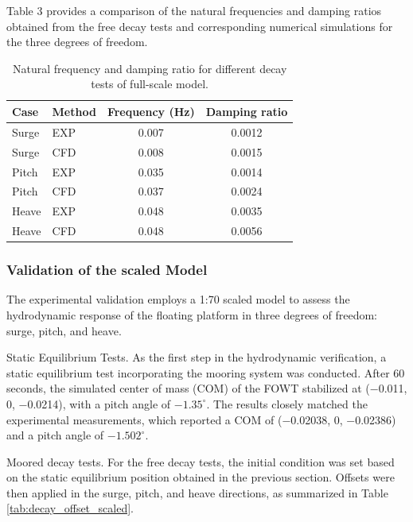 \documentclass[%
 aip,
 amsmath,amssymb,
 reprint,%
]{revtex4-1}
\begin{document}
Table 3 provides a comparison of the natural frequencies and damping ratios obtained from the free decay tests and corresponding numerical simulations for the three degrees of freedom.

\begin{table}[t]
    \centering
    \caption{Natural frequency and damping ratio for different decay tests of full-scale model.}
    \label{tab:decay_results}
    \begin{tabular}{llcc}
    \hline\hline
        \textbf{Case} & \textbf{Method} & \textbf{Frequency (Hz)} & \textbf{Damping ratio} \\ \hline
        Surge  & EXP & 0.007 & 0.0012 \\
        Surge  & CFD & 0.008 & 0.0015 \\
        Pitch  & EXP & 0.035 & 0.0014 \\
        Pitch  & CFD & 0.037 & 0.0024 \\
        Heave  & EXP & 0.048 & 0.0035 \\
        Heave  & CFD & 0.048 & 0.0056 \\
    \hline\hline
    \end{tabular}
\end{table}

\subsubsection{Validation of the scaled Model}

The experimental validation employs a 1:70 scaled model to assess the hydrodynamic response of the floating platform in three degrees of freedom: surge, pitch, and heave.

Static Equilibrium Tests. As the first step in the hydrodynamic verification, a static equilibrium test incorporating the mooring system was conducted. After 60 seconds, the simulated center of mass (COM) of the FOWT stabilized at (−0.011, 0, −0.0214), with a pitch angle of $-1.35^\circ$. The results closely matched the experimental measurements, which reported a COM of (−0.02038, 0, −0.02386) and a pitch angle of $-1.502^\circ$.

Moored decay tests. For the free decay tests, the initial condition was set based on the static equilibrium position obtained in the previous section. Offsets were then applied in the surge, pitch, and heave directions, as summarized in Table \ref{tab:decay_offset_scaled}.
\end{document}
